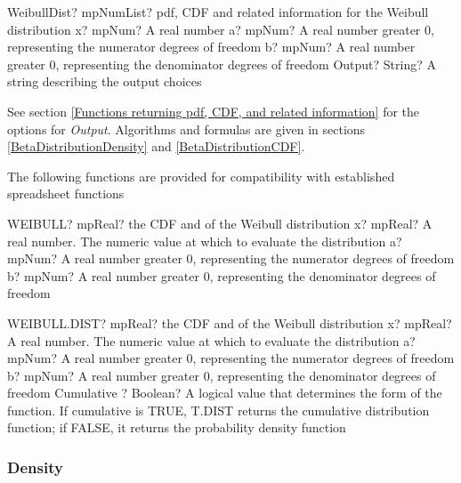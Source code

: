 \begin{mpFunctionsExtract}
	\mpFunctionFourNotImplemented
	{WeibullDist? mpNumList? pdf, CDF and related information for the Weibull distribution}
	{x? mpNum? A real number}
	{a? mpNum? A real number greater 0, representing the numerator  degrees of freedom}
	{b? mpNum? A real number greater 0, representing the denominator degrees of freedom}
	{Output? String? A string describing the output choices}
\end{mpFunctionsExtract}


\vspace{0.3cm}
See section \ref{Functions returning pdf, CDF, and related information} for the options for {\itshape\sffamily Output}. Algorithms and formulas are given in sections \ref{BetaDistributionDensity} and \ref{BetaDistributionCDF}.


\vspace{0.3cm}

The following functions are provided for compatibility with established spreadsheet functions

\vspace{0.3cm}
\begin{mpFunctionsExtract}
	\mpWorksheetFunctionThreeNotImplemented
	{WEIBULL? mpReal? the CDF and of the Weibull distribution}
	{x? mpReal? A real number. The numeric value at which to evaluate the distribution}
	{a? mpNum? A real number greater 0, representing the numerator  degrees of freedom}
	{b? mpNum? A real number greater 0, representing the denominator degrees of freedom}
\end{mpFunctionsExtract}

\vspace{0.6cm}
\begin{mpFunctionsExtract}
	\mpWorksheetFunctionFourNotImplemented
	{WEIBULL.DIST? mpReal? the CDF and of the Weibull distribution}
	{x? mpReal? A real number. The numeric value at which to evaluate the distribution}
	{a? mpNum? A real number greater 0, representing the numerator  degrees of freedom}
	{b? mpNum? A real number greater 0, representing the denominator degrees of freedom}
	{Cumulative ? Boolean? A logical value that determines the form of the function. If cumulative is TRUE, T.DIST returns the cumulative distribution function; if FALSE, it returns the probability density function}
\end{mpFunctionsExtract}



\subsubsection{Density}
\label{WeibullDistributionDensity}

